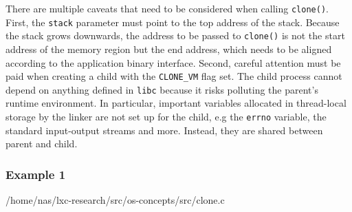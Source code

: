 There are multiple caveats that need to be considered when calling \verb|clone()|. 
First, the \verb|stack| parameter must point to the top address of the stack. Because the stack 
grows downwards, the address to be passed to \verb|clone()| is not the start address of the memory region but the 
end address, which needs to be aligned according to the application binary interface. Second, 
careful attention must be paid when creating a child with the \verb|CLONE_VM| flag set. 
The child process cannot depend on anything defined in \verb|libc| because it risks polluting 
the parent's runtime environment. In particular, important variables allocated in thread-local storage 
by the linker are not set up for the child, e.g the \verb|errno| variable, the standard input-output streams
and more. Instead, they are shared between parent and child. 

\subsubsection{Example 1}


{/home/nas/lxc-research/src/os-concepts/src/clone.c}

